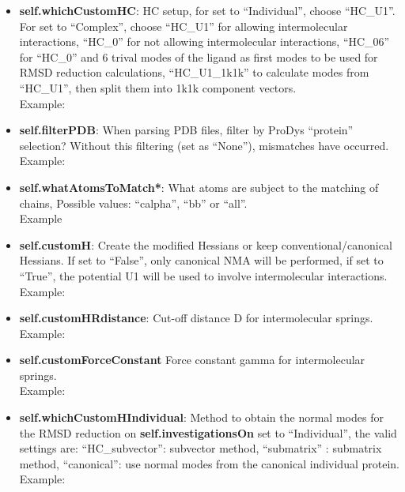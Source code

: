 \documentclass[11pt]{article}
\begin{document}
\begin{itemize}
\item \textbf{self.whichCustomHC}: HC setup, for \textbf{} set to ``Individual'', choose ``HC\_U1''. For \textbf{} set to ``Complex'', choose ``HC\_U1'' for allowing intermolecular interactions, ``HC\_0'' for not allowing intermolecular interactions, ``HC\_06'' for ``HC\_0'' and 6 trival modes of the ligand as first modes to be used for RMSD reduction calculations, ``HC\_U1\_1k1k'' to calculate modes from ``HC\_U1'', then split them into 1k1k component vectors. \\ 
Example: 

\item \textbf{self.filterPDB}: When parsing PDB files, filter by ProDys ``protein'' selection? Without this filtering (set as ``None''), mismatches have occurred. \\
Example: 

\item \textbf{self.whatAtomsToMatch*}: What atoms are subject to the matching of chains, Possible values: ``calpha'', ``bb'' or ``all''. \\
Example 

\item \textbf{self.customH}: Create the modified Hessians or keep conventional/canonical Hessians. If set to ``False'', only canonical NMA will be performed, if set to ``True'', the potential U1 will be used to involve intermolecular interactions. \\
Example: 

\item \textbf{self.customHRdistance}: Cut-off distance D for intermolecular springs. \\
Example: 

\item \textbf{self.customForceConstant} Force constant gamma for intermolecular springs. \\
Example: 

\item \textbf{self.whichCustomHIndividual}: Method to obtain the normal modes for the RMSD reduction on \textbf{self.investigationsOn} set to ``Individual'', the valid settings are: ``HC\_subvector'': subvector method, ``submatrix'' : submatrix method, ``canonical'': use normal modes from the canonical individual protein. \\
Example: 


\end{itemize}
\end{document}
